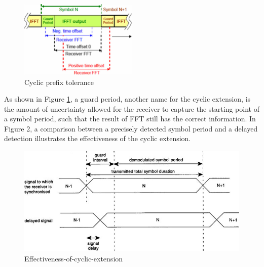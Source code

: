 \begin{figure}[ht]
    \centering
    \includegraphics[width=0.5\textwidth]{Figures/Cyclic-extension-tolerance}
    \caption{Cyclic prefix tolerance}
    \label{Cyclic-extension-tolerance}
\end{figure}

As shown in Figure \ref{Cyclic-extension-tolerance}, a guard period, another name for the cyclic extension, is the amount of uncertainty allowed for the receiver to capture the starting point of a symbol period, such that the result of FFT still has the correct information. In Figure 2, a comparison between a precisely detected symbol period and a delayed detection illustrates the effectiveness of the cyclic extension.

\begin{figure}[ht]
    \centering
    \includegraphics[width=\textwidth]{Figures/Effectiveness-of-cyclic-extension}
    \caption{Effectiveness-of-cyclic-extension}
    \label{Effectiveness-of-cyclic-extension}
\end{figure}


